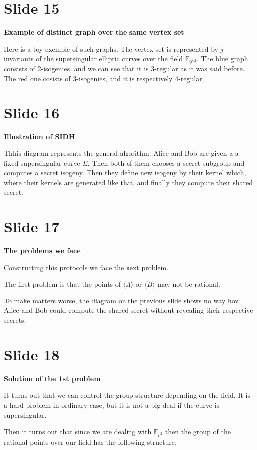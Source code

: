 \documentclass[10 pt]{article}
\begin{document}
{\section{Slide 15} \large{\textbf{Example of distinct graph over the same vertex set}}

Here is a toy exemple of such graphs. The vertex set is represented by $j$-invariants of the supersingular elliptic curves over the field $\mathbb{F}_{{97}^2}$. The blue graph consists of 2-isogenies, and we can see that it is 3-regular as it was said before. The red one cosists of 3-isogenies, and it is respectively 4-regular.

\section{Slide 16} \large{\textbf{Illustration of SIDH}}

Thhis diagram represents the general algorithm. Alice and Bob are given a a fixed supersingular curve $E$. Then both of them chooses a secret subgroup and computes a secret isogeny. Then they define new isogeny by their kernel which, where their kernels are generated like that, and finally they compute their shared secret.

\section{Slide 17} \large{\textbf{The problems we face}}

Constructing this protocols we face the next problem.

The first problem is that the points of $\langle A \rangle$ or $\langle B \rangle$ may not be rational.

To make matters worse, the diagram on the previous slide shows no way hov Alice and Bob could compute the shared secret without revealing their respective secrets.

\section{Slide 18} \large{\textbf{Solution of the 1st problem}}

It turns out that we can control the group structure depending on the field. It is a hard problem in ordinary case, but it is not a big deal if the curve is supersingular.

Then it turns out that since we are dealing with $\mathbb{F}_{p^2}$ then the group of the rational points over our field has the following structure.

}
\end{document}
